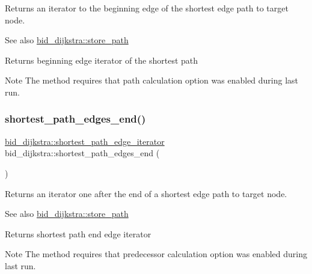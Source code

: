 Returns an iterator to the beginning edge of the shortest edge path to target node. 

\begin{DoxySeeAlso}{See also}
\mbox{\hyperlink{classbid__dijkstra_a0032d9b44c8b3f6f5733ff3ef94cf169}{bid\+\_\+dijkstra\+::store\+\_\+path}}
\end{DoxySeeAlso}
\begin{DoxyReturn}{Returns}
beginning edge iterator of the shortest path
\end{DoxyReturn}
\begin{DoxyNote}{Note}
The method requires that path calculation option was enabled during last run. 
\end{DoxyNote}
\mbox{\label{classbid__dijkstra_a0c31fda13205cd7905ff2400c60bb5e2}} 
\subsubsection{\texorpdfstring{shortest\+\_\+path\+\_\+edges\+\_\+end()}{shortest\_path\_edges\_end()}}
{\footnotesize\ttfamily \mbox{\hyperlink{classbid__dijkstra_a703d0faf9568bc25a9305faa61412fe1}{bid\+\_\+dijkstra\+::shortest\+\_\+path\+\_\+edge\+\_\+iterator}} bid\+\_\+dijkstra\+::shortest\+\_\+path\+\_\+edges\+\_\+end (\begin{DoxyParamCaption}{ }\end{DoxyParamCaption})}



Returns an iterator one after the end of a shortest edge path to target node. 

\begin{DoxySeeAlso}{See also}
\mbox{\hyperlink{classbid__dijkstra_a0032d9b44c8b3f6f5733ff3ef94cf169}{bid\+\_\+dijkstra\+::store\+\_\+path}}
\end{DoxySeeAlso}
\begin{DoxyReturn}{Returns}
shortest path end edge iterator
\end{DoxyReturn}
\begin{DoxyNote}{Note}
The method requires that predecessor calculation option was enabled during last run. 
\end{DoxyNote}
\mbox{\label{classbid__dijkstra_a03807bf76c9a75f0e17e79d20d73f48d}} 
